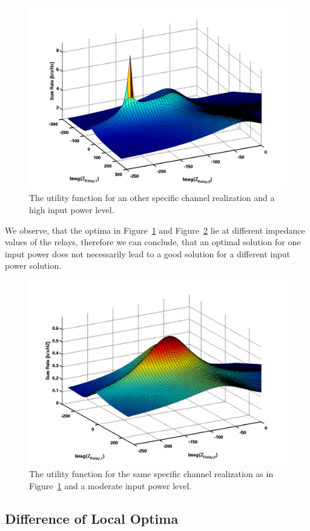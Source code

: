 \begin{figure}[h]
\centering
  \includegraphics[width=0.8\linewidth]{images/full_mesh_highsnr_99.png}
\caption{The utility function for an other specific channel realization and a high input power level.}
\label{fig:utility_power2}
\end{figure}

We observe, that the optima in Figure~\ref{fig:utility_power2} and Figure~\ref{fig:utility_power3} lie at different impedance values of the relays, therefore we can conclude, that an optimal solution for one input power does not necessarily lead to a good solution for a different input power solution.

\begin{figure}[h]
\centering
  \includegraphics[width=0.8\linewidth]{images/full_mesh_modsnr_99.png}
\caption{The utility function for the same specific channel realization as in Figure~\ref{fig:utility_power2} and a moderate input power level.}
\label{fig:utility_power3}
\end{figure}

\subsection{Difference of Local Optima}
\label{sec:}


